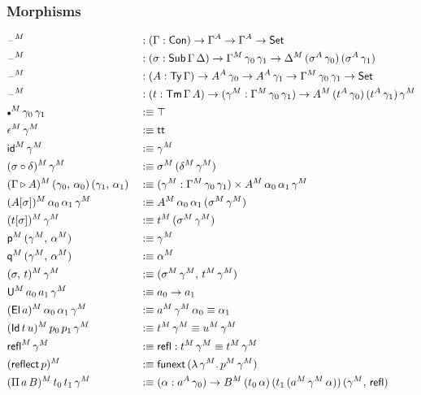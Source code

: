 \documentclass[12pt,a4paper,twoside,openany]{book}
\theoremstyle{remark}
\theoremstyle{definition}
\theoremstyle{theorem}
\newcommand{\ms}[1]{\mathsf{#1}}
\newcommand{\funext}{\ms{funext}}
\newcommand{\refl}{\mathsf{refl}}
\newcommand{\reflect}{\mathsf{reflect}}
\newcommand{\id}{\mathsf{id}}
\newcommand{\Con}{\mathsf{Con}}
\newcommand{\Sub}{\mathsf{Sub}}
\newcommand{\Tm}{\mathsf{Tm}}
\newcommand{\Ty}{\mathsf{Ty}}
\newcommand{\U}{\mathsf{U}}
\newcommand{\El}{\mathsf{El}}
\newcommand{\Id}{\mathsf{Id}}
\renewcommand{\tt}{\mathsf{tt}}
\newcommand{\blank}{\mathord{\hspace{1pt}\text{--}\hspace{1pt}}}
\newcommand{\Set}{\mathsf{Set}}
\newcommand{\ext}{\triangleright}
\newcommand{\emptycon}{\scaleobj{.75}\bullet}
\newcommand{\p}{\mathsf{p}}
\newcommand{\q}{\mathsf{q}}
\newcommand{\defn}{:\equiv}
\begin{document}
\subsubsection{Morphisms}

\begin{alignat*}{3}
  &\blank^M &&: (\Gamma : \Con) \to \Gamma^A \to \Gamma^A \to \Set\\
  &\blank^M &&: (\sigma : \Sub\,\Gamma\,\Delta) \to \Gamma^M\,\gamma_0\,\gamma_1 \to \Delta^M\,(\sigma^A\,\gamma_0)\,(\sigma^A\,\gamma_1)\\
  &\blank^M &&: (A : \Ty\,\Gamma) \to A^A\,\gamma_0 \to A^A\,\gamma_1 \to \Gamma^M\,\gamma_0\,\gamma_1 \to \Set\\
  &\blank^M &&: (t : \Tm\,\Gamma\,A) \to (\gamma^M : \Gamma^M\,\gamma_0\,\gamma_1) \to A^M\,(t^A\,\gamma_0)\,(t^A\,\gamma_1)\,\gamma^M\\
  &\emptycon^M\,\gamma_0\,\gamma_1 &&\defn \top \\
  &\epsilon^M\,\gamma^M &&\defn \tt\\
  &\id^M\,\gamma^M &&\defn \gamma^M\\
  &(\sigma \circ \delta)^M\,\gamma^M &&\defn \sigma^M\,(\delta^M\,\gamma^M)\\
  &(\Gamma \ext A)^M\,(\gamma_0,\,\alpha_0)\,(\gamma_1,\,\alpha_1) &&\defn
    (\gamma^M : \Gamma^M\,\gamma_0\,\gamma_1) \times A^M\,\alpha_0\,\alpha_1\,\gamma^M\\
  &(A[\sigma])^M\,\alpha_0\,\alpha_1\,\gamma^M &&\defn A^M\,\alpha_0\,\alpha_1\,(\sigma^M\,\gamma^M)\\
  &(t[\sigma])^M\,\gamma^M &&\defn t^M\,(\sigma^M\,\gamma^M)\\
  &\p^M\,(\gamma^M,\,\alpha^M) &&\defn \gamma^M\\
  &\q^M\,(\gamma^M,\,\alpha^M) &&\defn \alpha^M\\
  &(\sigma,\,t)^M\,\gamma^M &&\defn (\sigma^M\,\gamma^M,\,t^M\,\gamma^M)\\
  &\U^M\,a_0\,a_1\,\gamma^M &&\defn a_0 \to a_1\\
  &(\El\,a)^M\,\alpha_0\,\alpha_1\,\gamma^M &&\defn a^M\,\gamma^M\,\alpha_0 \equiv \alpha_1 \\
  &(\Id\,t\,u)^M\,p_0\,p_1\,\gamma^M &&\defn t^M\,\gamma^M \equiv u^M\,\gamma^M\\
  &\refl^M\,\gamma^M &&\defn \refl : t^M\,\gamma^M \equiv t^M\,\gamma^M\\
  &(\reflect\,p)^M &&\defn \funext\,(\lambda\,\gamma^M.\,p^M\,\gamma^M)\\
  &(\Pi\,a\,B)^M\,t_0\,t_1\,\gamma^M &&\defn (\alpha : a^A\,\gamma_0) \to B^M\,(t_0\,\alpha)\,(t_1\,(a^M\,\gamma^M\,\alpha))\,(\gamma^M,\,\refl)\\

\end{alignat*}
\end{document}
